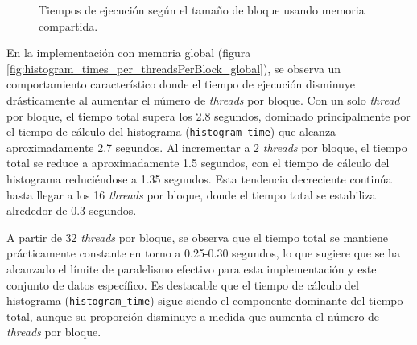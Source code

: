        \begin{figure}[H]
            \centering
            \caption{Tiempos de ejecución según el tamaño de bloque usando memoria compartida.}
            \label{fig:histogram_times_per_threadsPerBlock_shared}
        \end{figure}
        
        En la implementación con memoria global (figura \ref{fig:histogram_times_per_threadsPerBlock_global}), se observa un comportamiento característico donde el tiempo de ejecución disminuye drásticamente al aumentar el número de \textit{threads} por bloque. Con un solo \textit{thread} por bloque, el tiempo total supera los 2.8 segundos, dominado principalmente por el tiempo de cálculo del histograma (\texttt{histogram\_time}) que alcanza aproximadamente 2.7 segundos. Al incrementar a 2 \textit{threads} por bloque, el tiempo total se reduce a aproximadamente 1.5 segundos, con el tiempo de cálculo del histograma reduciéndose a 1.35 segundos. Esta tendencia decreciente continúa hasta llegar a los 16 \textit{threads} por bloque, donde el tiempo total se estabiliza alrededor de 0.3 segundos.
        
        A partir de 32 \textit{threads} por bloque, se observa que el tiempo total se mantiene prácticamente constante en torno a 0.25-0.30 segundos, lo que sugiere que se ha alcanzado el límite de paralelismo efectivo para esta implementación y este conjunto de datos específico. Es destacable que el tiempo de cálculo del histograma (\texttt{histogram\_time}) sigue siendo el componente dominante del tiempo total, aunque su proporción disminuye a medida que aumenta el número de \textit{threads} por bloque.
        
